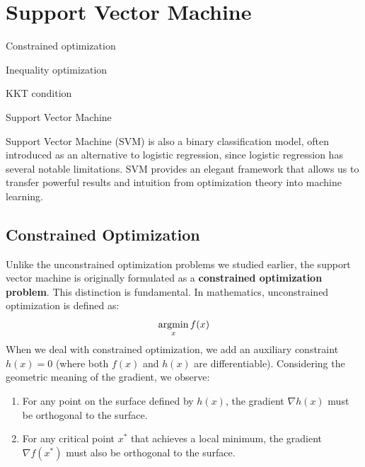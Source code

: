 \documentclass[../main]{subfiles}
\begin{document}
\chapter{Support Vector Machine}
\begin{introduction}
\item Constrained optimization
\item Inequality optimization
\item KKT condition
\item Support Vector Machine
\end{introduction}
Support Vector Machine (SVM) is also a binary classification model, often introduced as an alternative to logistic regression, since  logistic regression has several notable limitations. SVM provides an elegant framework that allows us to transfer powerful results and intuition from optimization theory into machine learning.
\section{Constrained Optimization}
Unlike the unconstrained optimization problems we studied earlier, the support vector machine is originally formulated as a \textbf{constrained optimization problem}. This distinction is fundamental. In mathematics, unconstrained optimization is defined as:
\begin{equation}
    \mathop{\mathrm{argmin}}_x f(x)
\end{equation}
When we deal with constrained optimization, we add an auxiliary constraint $h(x)=0$ (where both $f(x)$ and $h(x)$ are differentiable). Considering the geometric meaning of the gradient, we observe:

\begin{enumerate}
    \item For any point on the surface defined by $h(x)$, the gradient $\nabla h(x)$ must be orthogonal to the surface.
    \item For any critical point $x^*$ that achieves a local minimum, the gradient $\nabla f(x^*)$ must also be orthogonal to the surface.
\end{enumerate}
\end{document}
